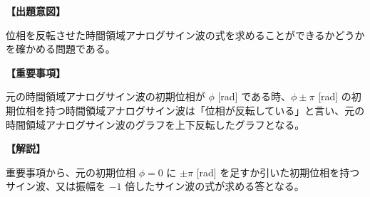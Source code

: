 \noindent \textbf{【出題意図】}

\noindent 位相を反転させた時間領域アナログサイン波の式を求めることができるかどうかを確かめる問題である。

\vspace{1em}
\noindent \textbf{【重要事項】}

\bigskip
元の時間領域アナログサイン波の初期位相が $\phi$ [rad] である時、$\phi \pm \pi$ [rad] の初期位相を持つ時間領域アナログサイン波は「位相が反転している」と言い、元の時間領域アナログサイン波のグラフを上下反転したグラフとなる。

\vspace{1em}
\noindent \textbf{【解説】}

\noindent 重要事項から、元の初期位相 $\phi = 0$ に $\pm \pi$ [rad] を足すか引いた初期位相を持つサイン波、又は振幅を $-1$ 倍したサイン波の式が求める答となる。
